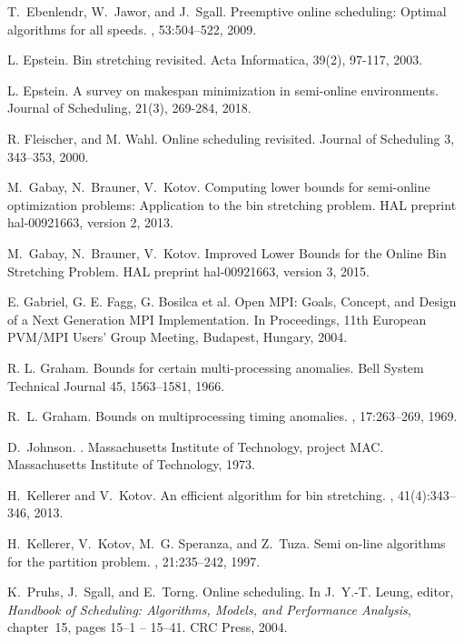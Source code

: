 \begin{thebibliography}{99}
T.~Ebenlendr, W.~Jawor, and J.~Sgall.
\newblock Preemptive online scheduling: {O}ptimal algorithms for all speeds.
, 53:504--522,
2009.

L. Epstein.
\newblock Bin stretching revisited.
\newblock Acta Informatica, 39(2), 97-117,
2003.

L. Epstein.
\newblock A survey on makespan minimization in semi-online environments.
\newblock Journal of Scheduling, 21(3), 269-284,
2018.

R. Fleischer, and M. Wahl.
\newblock Online scheduling revisited.
\newblock Journal of Scheduling 3, 343–353, 2000.

M.~Gabay, N.~Brauner, V.~Kotov.
\newblock Computing lower bounds for semi-online optimization
problems: Application to the bin stretching problem. 
\newblock HAL preprint hal-00921663, version 2,
2013.

M.~Gabay, N.~Brauner, V.~Kotov.
\newblock Improved Lower Bounds for the Online Bin Stretching Problem. 
\newblock HAL preprint hal-00921663, version 3,
2015.

E. Gabriel, G. E. Fagg, G. Bosilca et al.
\newblock Open MPI: Goals, Concept, and Design of a Next Generation MPI Implementation.
\newblock In Proceedings, 11th European PVM/MPI Users' Group Meeting, Budapest, Hungary, 2004.

R. L. Graham.
\newblock Bounds for certain multi-processing anomalies.
\newblock Bell System Technical Journal 45, 1563–1581, 1966.

R.~L. Graham.
\newblock Bounds on multiprocessing timing anomalies.
, 17:263--269, 1969.

D.~Johnson.
.
\newblock Massachusetts Institute of Technology, project MAC. Massachusetts
  Institute of Technology, 1973.

H.~Kellerer and V.~Kotov.
\newblock An efficient algorithm for bin stretching.
, 41(4):343--346, 2013.

H.~Kellerer, V.~Kotov, M.~G. Speranza, and Z.~Tuza.
\newblock Semi on-line algorithms for the partition problem.
, 21:235--242, 1997.

K.~Pruhs, J.~Sgall, and E.~Torng.
\newblock Online scheduling.
\newblock In J.~Y.-T. Leung, editor, {\em Handbook of Scheduling:
  {Algorithms}, Models, and Performance Analysis}, chapter~15, pages 15--1 --
  15--41. CRC Press, 2004.


\end{thebibliography}

